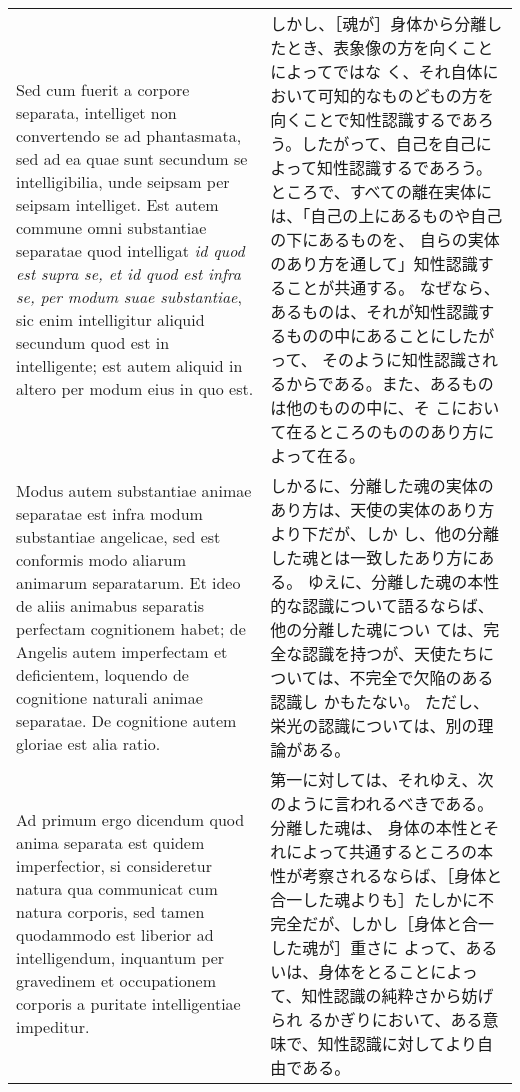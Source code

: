 \documentclass[10pt]{jsarticle} %
\begin{document}
\begin{longtable}{p{21em}p{21em}}
\\


Sed cum fuerit a corpore separata, intelliget non convertendo se ad
phantasmata, sed ad ea quae sunt secundum se intelligibilia, unde
seipsam per seipsam intelliget. Est autem commune omni substantiae
separatae quod intelligat {\it id quod est supra se, et id quod est
infra se, per modum suae substantiae}, sic enim intelligitur aliquid
secundum quod est in intelligente; est autem aliquid in altero per modum
eius in quo est. 

&
しかし、［魂が］身体から分離したとき、表象像の方を向くことによってではな
 く、それ自体において可知的なものどもの方を向くことで知性認識するであろ
 う。したがって、自己を自己によって知性認識するであろう。
ところで、すべての離在実体には、「自己の上にあるものや自己の下にあるものを、
 自らの実体のあり方を通して」知性認識することが共通する。
なぜなら、あるものは、それが知性認識するものの中にあることにしたがって、
 そのように知性認識されるからである。また、あるものは他のものの中に、そ
 こにおいて在るところのもののあり方によって在る。
\\


Modus autem substantiae animae separatae est infra
modum substantiae angelicae, sed est conformis modo aliarum animarum
separatarum. Et ideo de aliis animabus separatis perfectam cognitionem
habet; de Angelis autem imperfectam et deficientem, loquendo de
cognitione naturali animae separatae. De cognitione autem gloriae est
alia ratio.

&

しかるに、分離した魂の実体のあり方は、天使の実体のあり方より下だが、しか
 し、他の分離した魂とは一致したあり方にある。
ゆえに、分離した魂の本性的な認識について語るならば、他の分離した魂につい
 ては、完全な認識を持つが、天使たちについては、不完全で欠陥のある認識し
 かもたない。
ただし、栄光の認識については、別の理論がある。


\\



{\sc Ad primum ergo dicendum} quod anima separata est quidem imperfectior, si
consideretur natura qua communicat cum natura corporis, sed tamen
quodammodo est liberior ad intelligendum, inquantum per gravedinem et
occupationem corporis a puritate intelligentiae impeditur.

& 第一に対しては、それゆえ、次のように言われるべきである。分離した魂は、
身体の本性とそれによって共通するところの本性が考察されるならば、［身体と
合一した魂よりも］たしかに不完全だが、しかし［身体と合一した魂が］重さに
 よって、あるいは、身体をとることによって、知性認識の純粋さから妨げられ
 るかぎりにおいて、ある意味で、知性認識に対してより自由である。


\end{longtable}
\end{document}
